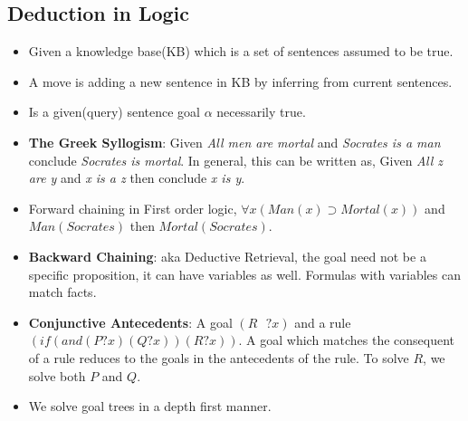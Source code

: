 \documentclass[a4paper]{article}
\begin{document}
\subsection{Deduction in Logic}
\begin{itemize}
    \item Given a knowledge base(KB) which is a set of sentences assumed to be true.
    \item A move is adding a new sentence in KB by inferring from current sentences.
    \item Is a given(query) sentence goal $\alpha$ necessarily true. 
    \item \textbf{The Greek Syllogism}: Given \textit{All men are mortal} and \textit{Socrates is a man} conclude \textit{Socrates is mortal}. In general, this can be written as, Given \textit{All z are y} and \textit{x is a z} then conclude \textit{x is y}.
    \item Forward chaining in First order logic, $\forall x(Man(x)\supset Mortal(x))$ and $Man(Socrates)$ then $Mortal(Socrates)$.
    \item \textbf{Backward Chaining}: aka Deductive Retrieval, the goal need not be a specific proposition, it can have variables as well. Formulas with variables can match facts.
    \item \textbf{Conjunctive Antecedents}: A goal $(R\text{ }?x)$ and a rule $(if(and(P?x)(Q?x))(R?x))$. A goal which matches the consequent of a rule reduces to the goals in the antecedents of the rule. To solve $R$, we solve both $P$ and $Q$.
    \item We solve goal trees in a depth first manner.
\end{itemize}
\end{document}
